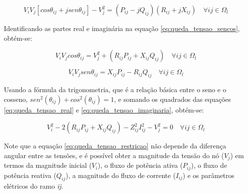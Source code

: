 \begin{equation}\label{eq:queda_tensao_sencos}
    V_{i}V_{j}[cos\theta_{ij} + jsen\theta_{ij}] - V_{j}^{2} = (P_{ij} - jQ_{ij})(R_{ij} + jX_{ij}) \quad\forall ij \in \Omega_{l}
\end{equation}

Identificando as partes real e imaginária na equação \ref{eq:queda_tensao_sencos}, obtém-se:

\begin{equation}
    V_{i}V_{j}cos\theta_{ij} = V_{j}^{2} + (R_{ij}P_{ij} + X_{ij}Q_{ij})\quad\forall ij \in \Omega_{l}
    \label{eq:queda_tensao_real}
\end{equation}

\begin{equation}
    V_{i}V_{j}sen\theta_{ij} = X_{ij}P_{ij} - R_{ij}Q_{ij}\quad\forall ij \in \Omega_{l}
    \label{eq:queda_tensao_imaginaria}
\end{equation}

Usando a fórmula da trigonometria, que é a relação básica entre o seno e o cosseno, $sen^{2}(\theta_{ij}) + cos^{2}(\theta_{ij}) = 1$, e somando os quadrados das equações \ref{eq:queda_tensao_real} e \ref{eq:queda_tensao_imaginaria}, obtém-se:

\begin{equation}
    V_{i}^{2} - 2(R_{ij}P_{ij} + X_{ij}Q_{ij}) - Z_{ij}^{2}I_{ij}^{2} - V_{j}^{2} = 0\quad\forall ij \in \Omega_{l}
    \label{eq:queda_tensao_restricao}
\end{equation}

Note que a equação \ref{eq:queda_tensao_restricao} não depende da diferença angular entre as tensões, e é possível obter a magnitude da tensão do nó ($V_j$) em termos da magnitude inicial ($V_i$), o fluxo de potência ativa ($P_{ij}$), o fluxo de potência reativa ($Q_{ij}$), a magnitude do fluxo de corrente ($I_{ij}$) e os parâmetros elétricos do ramo \textit{ij}.


